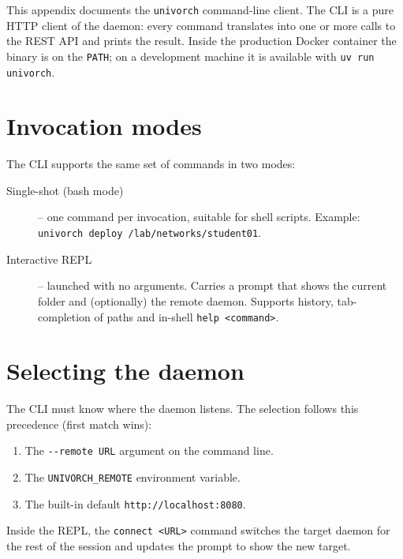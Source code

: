 
\label{ap:cli-reference}

This appendix documents the \texttt{univorch} command-line client.
The CLI is a pure HTTP client of the daemon: every command translates
into one or more calls to the REST API and prints the result. Inside
the production Docker container the binary is on the \texttt{PATH};
on a development machine it is available with \texttt{uv run
univorch}.

\section{Invocation modes}

The CLI supports the same set of commands in two modes:

\begin{description}
  \item[Single-shot (bash mode)] -- one command per invocation, suitable
        for shell scripts.
        Example: \texttt{univorch deploy /lab/networks/student01}.
  \item[Interactive REPL] -- launched with no arguments. Carries a
        prompt that shows the current folder and (optionally) the
        remote daemon. Supports history, tab-completion of paths and
        in-shell \texttt{help <command>}.
\end{description}

\section{Selecting the daemon}

The CLI must know where the daemon listens. The selection follows
this precedence (first match wins):

\begin{enumerate}
  \item The \texttt{-{}-remote URL} argument on the command line.
  \item The \texttt{UNIVORCH\_REMOTE} environment variable.
  \item The built-in default \texttt{http://localhost:8080}.
\end{enumerate}

Inside the REPL, the \texttt{connect <URL>} command switches the
target daemon for the rest of the session and updates the prompt to
show the new target.

